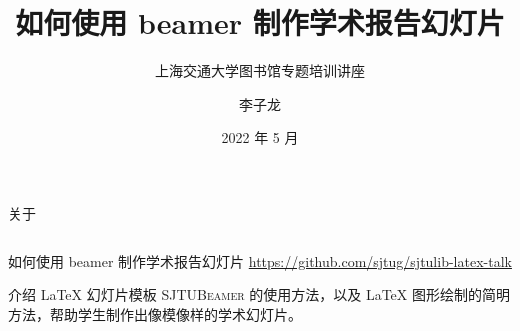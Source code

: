 
\title{如何使用 beamer 制作学术报告幻灯片}
\subtitle{上海交通大学图书馆专题培训讲座}
\author{李子龙}
\date{2022 年 5 月}
\subject{LaTeX, 幻灯片制作, SJTUBeamer}
\maketitle

\providecommand{\TikZ}{Ti\textit{k}Z}
\providecommand{\pgf}{\textsc{pgf}}
\providecommand{\pgfplots}{\textsc{pgfplots}}
\providecommand{\pgfplotstable}{\textsc{PgfplotsTable}}

\begin{frame}{关于}
  \begin{columns}[c]
  \begin{column}{.7\textwidth}
    \begin{block}{如何使用 beamer 制作学术报告幻灯片}
    \alert{\url{https://github.com/sjtug/sjtulib-latex-talk}}
    
    \begin{flushleft}
      \small 介绍 \LaTeX{} 幻灯片模板 \textsc{SJTUBeamer} 的使用方法，以及 \LaTeX{} 图形绘制的简明方法，帮助学生制作出像模像样的学术幻灯片。
    \end{flushleft}


\end{block}
\end{column}
\end{columns}
\end{frame}
